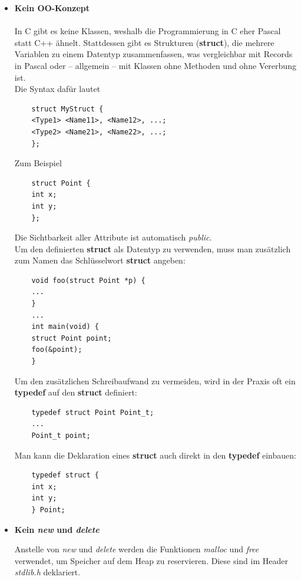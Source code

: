 \begin{itemize}
	\item[] \textbf{Kein OO-Konzept}\\\\
	In C gibt es keine Klassen, weshalb die Programmierung in C eher Pascal statt C++ ähnelt.
	Stattdessen gibt es Strukturen (\textbf{struct}), die mehrere Variablen zu einem Datentyp zusammenfassen, was vergleichbar mit Records in Pascal oder -- allgemein -- mit Klassen ohne Methoden und ohne Vererbung ist.\\
	
	Die Syntax dafür lautet
	\begin{lstlisting}
	struct MyStruct {
	<Type1> <Name11>, <Name12>, ...;
	<Type2> <Name21>, <Name22>, ...;
	};
	\end{lstlisting} 
	
	Zum Beispiel
	\begin{lstlisting}
	struct Point {
	int x;
	int y;
	};
	\end{lstlisting}
	
	Die Sichtbarkeit aller Attribute ist automatisch \emph{public}. \\
	
	Um den definierten \textbf{struct} als Datentyp zu verwenden, muss man zusätzlich zum Namen das Schlüsselwort \textbf{struct} angeben:
	
	\begin{lstlisting}
	void foo(struct Point *p) {
	...
	}
	...
	int main(void) {
	struct Point point;
	foo(&point);
	}
	\end{lstlisting}
	
	Um den zusätzlichen Schreibaufwand zu vermeiden, wird in der Praxis oft ein \textbf{typedef} auf den \textbf{struct} definiert:
	
	\begin{lstlisting}
	typedef struct Point Point_t;
	...
	Point_t point;
	\end{lstlisting}
	
	Man kann die Deklaration eines \textbf{struct} auch direkt in den \textbf{typedef} einbauen:
	\begin{lstlisting}
	typedef struct {
	int x;
	int y;	
	} Point;
	\end{lstlisting}
	
	\item[] \textbf{Kein \emph{new} und \emph{delete}}
	
	Anstelle von \emph{new} und \emph{delete} werden die Funktionen \emph{malloc} und \emph{free} verwendet, um Speicher auf dem Heap zu reservieren. 
	Diese sind im Header \emph{stdlib.h} deklariert.
	

\end{itemize}
